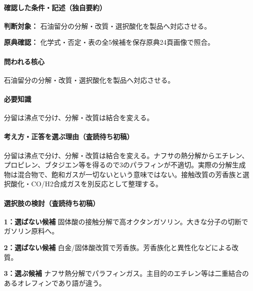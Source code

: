 \paragraph{確認した条件・記述（独自要約）}\mbox{}\par

\noindent\textbf{判断対象：} 石油留分の分解・改質・選択酸化を製品へ対応させる。\par

\noindent\textbf{原典確認：} 化学式・否定・表の全5候補を保存原典24頁画像で照合。\par

\paragraph{問われる核心} 石油留分の分解・改質・選択酸化を製品へ対応させる。

\paragraph{必要知識} 分留は沸点で分け、分解・改質は結合を変える。

\paragraph{考え方・正答を選ぶ理由（査読待ち初稿）} 分留は沸点で分け、分解・改質は結合を変える。ナフサの熱分解からエチレン、プロピレン、ブタジエン等を得るので3のパラフィンが不適切。実際の分解生成物は混合物で、飽和ガスが一切ないという意味ではない。接触改質の芳香族と選択酸化・CO/H2合成ガスを別反応として整理する。

\paragraph{選択肢の検討（査読待ち初稿）}\mbox{}\par

\noindent\textbf{1：選ばない候補} 固体酸の接触分解で高オクタンガソリン。大きな分子の切断でガソリン原料へ。\par

\noindent\textbf{2：選ばない候補} 白金/固体酸改質で芳香族。芳香族化と異性化などによる改質。\par

\noindent\textbf{3：選ぶ候補} ナフサ熱分解でパラフィンガス。主目的のエチレン等は二重結合のあるオレフィンであり語が違う。\par

